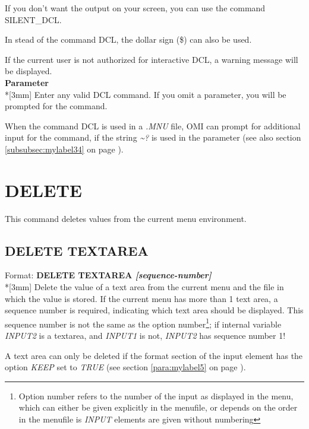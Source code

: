 \documentclass[a4paper]{book}
\newcommand{\vs}{\vspace{3mm}}
\renewcommand{\indent}{\hspace*{5mm}}
\begin{document}
If you don't want the output on your screen, you can use the command 
\textsf{SILENT{\_}DCL}.

\vs

In stead of the command \textsf{DCL}, the dollar sign 
(\textsf{{\$}})\index{{\$}} can also be used.

\vs

If the current user is not authorized for interactive DCL, a warning message 
will be displayed.\\[3mm]
\textbf{Parameter}\\*[3mm]
Enter any valid DCL command. If you omit a parameter, you will be prompted 
for the command.

When the command DCL is used in a \textsl{.MNU} file, OMI can prompt for additional 
input for the command, if the string \textsl{\~{}?} is used in the parameter
(see also section \ref{subsubsec:mylabel34} on page \pageref{para:dyninput}).

\section{DELETE}
\label{subsec:delete}

This command deletes values from the current menu environment.

\subsection{DELETE TEXTAREA}
\label{subsubsec:delete}

\indent Format: \textbf{DELETE TEXTAREA \textit{[sequence-number]}}\\*[3mm]
Delete the value of a text area from the current menu and the file in which 
the value is stored. If the current menu has more than 1 text area, a 
sequence number is required, indicating which text area should be displayed. 
This sequence number is not the same as the option number\footnote{\label{footnote:optionnumber} Option number refers to the number
of the input as displayed in the menu, which can either be given explicitly in the menufile, or
depends on the order in the menufile is \textsl{INPUT} elements are given without numbering}; if internal variable \textsl{INPUT2} is a textarea, and \textsl{INPUT1} is not, \textsl{INPUT2} has sequence number 1!

A text area can only be deleted if the format section of the input element 
has the option \textsl{KEEP} set to \textsl{TRUE} (see section \ref{para:mylabel5} on page \pageref{para:mylabel5}).
\end{document}
